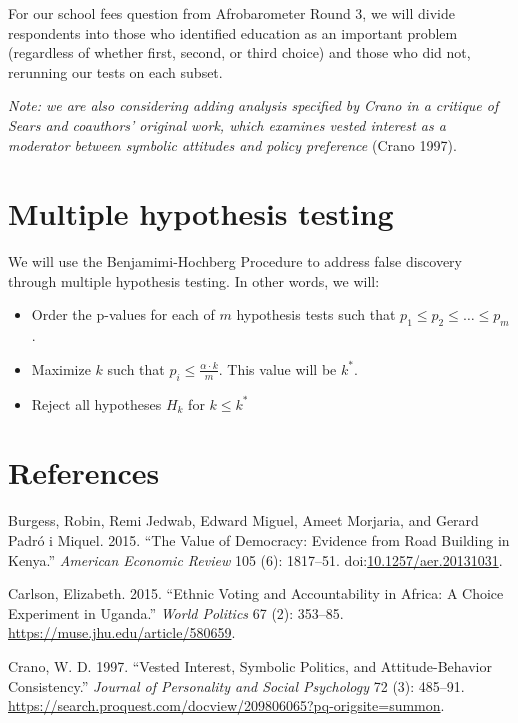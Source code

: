 \documentclass[]{article}
\begin{document}
For our school fees question from Afrobarometer Round 3, we will divide
respondents into those who identified education as an important problem
(regardless of whether first, second, or third choice) and those who did
not, rerunning our tests on each subset.

\textit{Note: we are also considering adding analysis specified by Crano in a critique of Sears and coauthors' original work, which examines vested interest as a moderator between symbolic attitudes and policy preference}
(Crano 1997).

\section{Multiple hypothesis testing}\label{multiple-hypothesis-testing}

We will use the Benjamimi-Hochberg Procedure to address false discovery
through multiple hypothesis testing. In other words, we will:

\begin{itemize}
  \item Order the p-values for each of $m$ hypothesis tests such that $p_1 \leq p_2 \leq \ldots \leq p_m$.
  \item Maximize $k$ such that $p_i \leq \frac{\alpha \cdot k}{m}$. This value will be $k^*$.
  \item Reject all hypotheses $H_k$ for $k \leq k^*$
\end{itemize}

\section*{References}\label{references}

\hypertarget{refs}{}
\hypertarget{ref-burgess_value_2015}{}
Burgess, Robin, Remi Jedwab, Edward Miguel, Ameet Morjaria, and Gerard
Padró i Miquel. 2015. ``The Value of Democracy: Evidence from Road
Building in Kenya.'' \emph{American Economic Review} 105 (6): 1817--51.
doi:\href{https://doi.org/10.1257/aer.20131031}{10.1257/aer.20131031}.

\hypertarget{ref-carlson_ethnic_2015}{}
Carlson, Elizabeth. 2015. ``Ethnic Voting and Accountability in Africa:
A Choice Experiment in Uganda.'' \emph{World Politics} 67 (2): 353--85.
\url{https://muse.jhu.edu/article/580659}.

\hypertarget{ref-crano_vested_1997}{}
Crano, W. D. 1997. ``Vested Interest, Symbolic Politics, and
Attitude-Behavior Consistency.'' \emph{Journal of Personality and Social
Psychology} 72 (3): 485--91.
\url{https://search.proquest.com/docview/209806065?pq-origsite=summon}.
\end{document}
